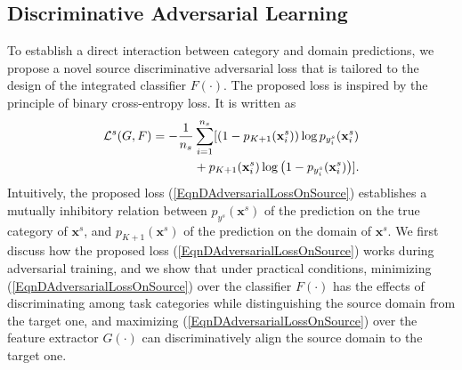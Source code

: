 \documentclass[letterpaper]{article} \usepackage{aaai20}  \usepackage{times}  \usepackage{helvet} \usepackage{courier}  \usepackage[hyphens]{url}  \usepackage{graphicx} \urlstyle{rm} \def\UrlFont{\rm}  \usepackage{graphicx}  \frenchspacing  \setlength{\pdfpagewidth}{8.5in}  \setlength{\pdfpageheight}{11in}
\begin{document}
\subsection{Discriminative Adversarial Learning}
To establish a direct interaction between category and domain predictions, we propose a novel source discriminative adversarial loss that is tailored to the design of the integrated classifier $F(\cdot)$. The proposed loss is inspired by the principle of binary cross-entropy loss. It is written as
\begin{eqnarray}\label{EqnDAdversarialLossOnSource}
\begin{aligned}
{\cal{L}}^s (G, F) = - \frac{1}{n_s} & \sum_{i=1}^{n_s} [\left(1 - p_{K+1}(\mathbf{x}_i^s)\right)\log p_{y_i^s}(\mathbf{x}_i^s) \\ & +  p_{K+1}(\mathbf{x}_i^s)\log\left(1 - p_{y_i^s}(\mathbf{x}_i^s)\right)] .
\end{aligned}
\end{eqnarray}
Intuitively, the proposed loss (\ref{EqnDAdversarialLossOnSource}) establishes a mutually inhibitory relation between $p_{y^s}(\mathbf{x}^s)$ of the prediction on the true category of $\mathbf{x}^s$, and $p_{K+1}(\mathbf{x}^s)$ of the prediction on the domain of $\mathbf{x}^s$. We first discuss how the proposed loss (\ref{EqnDAdversarialLossOnSource}) works during adversarial training, and we show that under practical conditions, minimizing (\ref{EqnDAdversarialLossOnSource}) over the classifier $F(\cdot)$ has the effects of discriminating among task categories while distinguishing the source domain from the target one, and maximizing (\ref{EqnDAdversarialLossOnSource}) over the feature extractor $G(\cdot)$ can discriminatively align the source domain to the target one.
\end{document}

